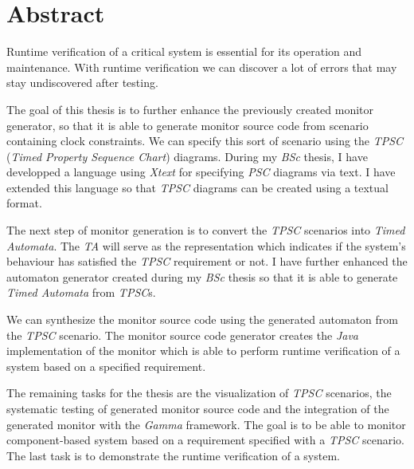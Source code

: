\vfill
\selectenglish


\chapter*{Abstract}

Runtime verification of a critical system is essential for its operation and maintenance.
With runtime verification we can discover a lot of errors that may stay undiscovered after testing.

The goal of this thesis is to further enhance the previously created monitor generator, so that it is able to generate monitor source code from scenario containing clock constraints.
We can specify this sort of scenario using the \textit{TPSC} (\textit{Timed Property Sequence Chart}) diagrams.
During my \textit{BSc} thesis, I have developped a language using \textit{Xtext} for specifying \textit{PSC} diagrams via text.
I have extended this language so that \textit{TPSC} diagrams can be created using a textual format.

The next step of monitor generation is to convert the \textit{TPSC} scenarios into \textit{Timed Automata}.
The \textit{TA} will serve as the representation which indicates if the system's behaviour has satisfied the \textit{TPSC} requirement or not.
I have further enhanced the automaton generator created during my \textit{BSc} thesis so that it is able to generate \textit{Timed Automata} from \textit{TPSC}s.

We can synthesize the monitor source code using the generated automaton from the \textit{TPSC} scenario.
The monitor source code generator creates the \textit{Java} implementation of the monitor which is able to perform runtime verification of a system based on a specified requirement.

The remaining tasks for the thesis are the visualization of \textit{TPSC} scenarios, the systematic testing of generated monitor source code and the integration of the generated monitor with the \textit{Gamma} framework.
The goal is to be able to monitor component-based system based on a requirement specified with a \textit{TPSC} scenario.
The last task is to demonstrate the runtime verification of a system.

\vfill
\selectthesislanguage

\setcounter{romanPage}{\value{page}}
